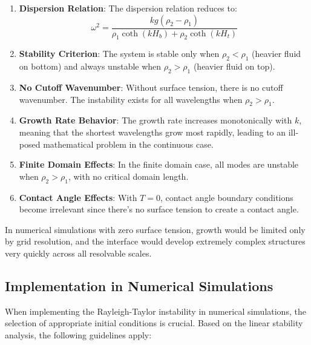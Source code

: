 \documentclass[12pt,a4paper]{article}
\begin{document}
\begin{enumerate}
    \item \textbf{Dispersion Relation}: The dispersion relation reduces to:
    \begin{equation}
    \omega^2 = \frac{k g(\rho_2 - \rho_1)}{\rho_1\coth(kH_b) + \rho_2\coth(kH_t)}
    \end{equation}
    
    \item \textbf{Stability Criterion}: The system is stable only when $\rho_2 < \rho_1$ (heavier fluid on bottom) and always unstable when $\rho_2 > \rho_1$ (heavier fluid on top).
    
    \item \textbf{No Cutoff Wavenumber}: Without surface tension, there is no cutoff wavenumber. The instability exists for all wavelengths when $\rho_2 > \rho_1$.
    
    \item \textbf{Growth Rate Behavior}: The growth rate increases monotonically with $k$, meaning that the shortest wavelengths grow most rapidly, leading to an ill-posed mathematical problem in the continuous case.
    
    \item \textbf{Finite Domain Effects}: In the finite domain case, all modes are unstable when $\rho_2 > \rho_1$, with no critical domain length.
    
    \item \textbf{Contact Angle Effects}: With $T = 0$, contact angle boundary conditions become irrelevant since there's no surface tension to create a contact angle.
\end{enumerate}

In numerical simulations with zero surface tension, growth would be limited only by grid resolution, and the interface would develop extremely complex structures very quickly across all resolvable scales.

\subsection{Implementation in Numerical Simulations}
When implementing the Rayleigh-Taylor instability in numerical simulations, the selection of appropriate initial conditions is crucial. Based on the linear stability analysis, the following guidelines apply:
\end{document}
